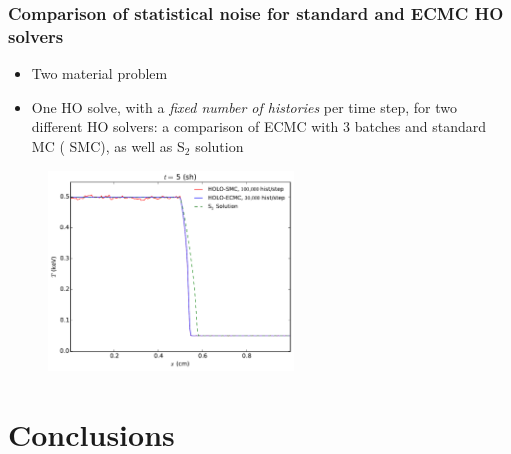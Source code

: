 \documentclass[xcolor=dvipsnames,handout,hyperref={pdfpagelabels=false}]{beamer}
\newcommand{\colb}[1]{{\color{blue} #1}}
\newcommand{\colr}[1]{{\color{red} #1}}
\newlength{\wideitemsep}
\let\olditem\item
\renewcommand{\item}{\setlength{\itemsep}{\wideitemsep}\olditem}
\begin{document}
\begin{frame}
    \frametitle{Comparison of statistical noise for standard and ECMC HO solvers}
    \begin{block}{}
    \begin{itemize}
        \item Two material problem
        \item One HO solve, with a \emph{fixed number of histories} per time step,
            for two different HO solvers: a
            comparison of
            \colr{ECMC} with 3 batches and standard MC (\colb{SMC}), as well as S$_2$
            solution
    \end{itemize}
    \end{block}
    \centering
    \begin{figure}
    \includegraphics[width=0.5799\textwidth]{two_mat_ho_compare.pdf}
    \centering
    \end{figure}
\end{frame}

\section{Conclusions}
\subsection{}
\end{document}
